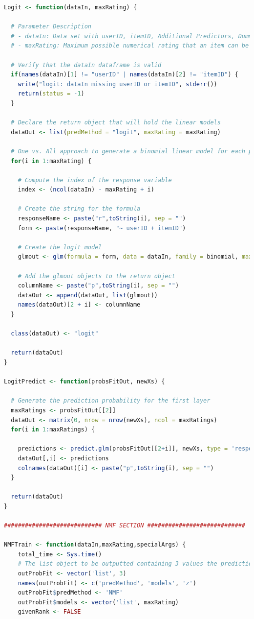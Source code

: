 \documentclass{article}
\begin{document}
\begin{lstlisting}[language=R]
Logit <- function(dataIn, maxRating) {

  # Parameter Description
  # - dataIn: Data set with userID, itemID, Additional Predictors, Dummy Ratings
  # - maxRating: Maximum possible numerical rating that an item can be given

  # Verify that the dataIn dataframe is valid
  if(names(dataIn)[1] != "userID" | names(dataIn)[2] != "itemID") {
    write("logit: dataIn missing userID or itemID", stderr())
    return(status = -1)
  }

  # Declare the return object that will hold the linear models
  dataOut <- list(predMethod = "logit", maxRating = maxRating)

  # One vs. All approach to generate a binomial linear model for each possible rating
  for(i in 1:maxRating) {

    # Compute the index of the response variable
    index <- (ncol(dataIn) - maxRating + i)

    # Create the string for the formula
    responseName <- paste("r",toString(i), sep = "")
    form <- paste(responseName, "~ userID + itemID")

    # Create the logit model
    glmout <- glm(formula = form, data = dataIn, family = binomial, maxit = 50)

    # Add the glmout objects to the return object
    columnName <- paste("p",toString(i), sep = "")
    dataOut <- append(dataOut, list(glmout))
    names(dataOut)[2 + i] <- columnName
  }

  class(dataOut) <- "logit"

  return(dataOut)
}

LogitPredict <- function(probsFitOut, newXs) {

  # Generate the prediction probability for the first layer
  maxRatings <- probsFitOut[[2]]
  dataOut <- matrix(0, nrow = nrow(newXs), ncol = maxRatings)
  for(i in 1:maxRatings) {

    predictions <- predict.glm(probsFitOut[[2+i]], newXs, type = 'response')
    dataOut[,i] <- predictions
    colnames(dataOut)[i] <- paste("p",toString(i), sep = "")
  }

  return(dataOut)
}

############################ NMF SECTION ############################

NMFTrain <- function(dataIn,maxRating,specialArgs) {
	total_time <- Sys.time()
	# The list object to be outputted containing 3 values the prediction method and the list of trained models
	outProbFit <- vector('list', 3)
	names(outProbFit) <- c('predMethod', 'models', 'z')
	outProbFit$predMethod <- 'NMF'
	outProbFit$models <- vector('list', maxRating)
	givenRank <- FALSE


\end{lstlisting}
\end{document}
